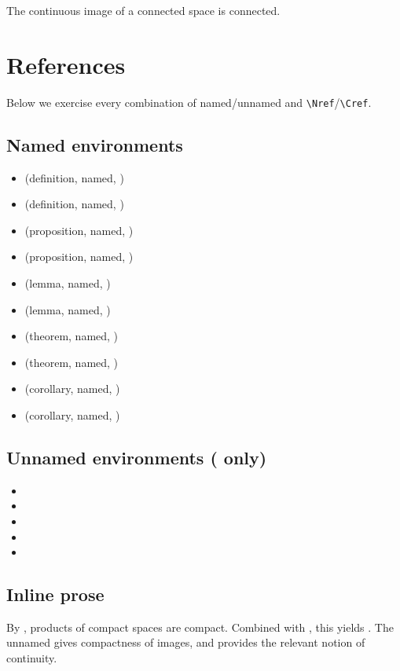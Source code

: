 \documentclass{article}
\theoremstyle{mytheoremstyle}{\newtheorem{definition}{Definition}[section]}
\theoremstyle{mytheoremstyle}{\newtheorem{proposition}[definition]{Proposition}}
\theoremstyle{mytheoremstyle}{\newtheorem{theorem}[definition]{Theorem}}
\theoremstyle{mytheoremstyle}{\newtheorem{lemma}[definition]{Lemma}}
\theoremstyle{mytheoremstyle}{\newtheorem{corollary}[definition]{Corollary}}
\begin{document}
\begin{corollary}
  \label{cor:unnamed}
  The continuous image of a connected space is connected.
\end{corollary}

\section{References}

Below we exercise every combination of named/unnamed and \verb|\Nref|/\verb|\Cref|.

\subsection*{Named environments}

\begin{itemize}
  \item {} (definition, named, \texttt{\string\Nref})
  \item {} (definition, named, \texttt{\string\Cref})
  \item {} (proposition, named, \texttt{\string\Nref})
  \item {} (proposition, named, \texttt{\string\Cref})
  \item {} (lemma, named, \texttt{\string\Nref})
  \item {} (lemma, named, \texttt{\string\Cref})
  \item {} (theorem, named, \texttt{\string\Nref})
  \item {} (theorem, named, \texttt{\string\Cref})
  \item {} (corollary, named, \texttt{\string\Nref})
  \item {} (corollary, named, \texttt{\string\Cref})
\end{itemize}

\subsection*{Unnamed environments (\texttt{\string\Cref} only)}

\begin{itemize}
  \item {}
  \item {}
  \item {}
  \item {}
  \item {}
\end{itemize}

\subsection*{Inline prose}

By , products of compact spaces are compact.
Combined with , this yields .
The unnamed  gives compactness of images,
and  provides the relevant notion of continuity.

\end{document}
